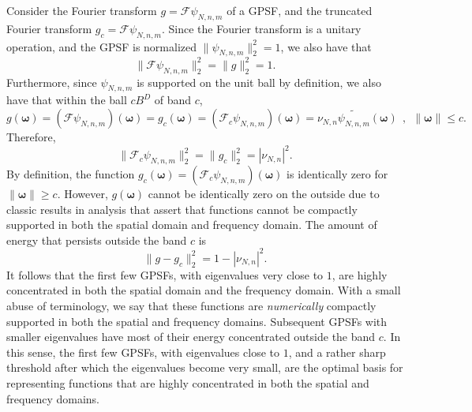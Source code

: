 \documentclass[12pt]{article}
\begin{document}
Consider the Fourier transform $g = \mathcal{F} \psi_{N,n,m}$ of a GPSF,
and the truncated Fourier transform $g_c = \mathcal{F} \psi_{N,n,m}$.
Since the Fourier transform is a unitary operation, and the GPSF is normalized $\|\psi_{N,n,m}\|_2^2=1$,
we also have that 
\begin{equation}
\| \mathcal{F} \psi_{N,n,m} \|_2^2 = \|g\|_2^2=1. 
\end{equation}
Furthermore, since $\psi_{N,n,m}$ is supported on the unit ball by definition, we also have that within the ball $cB^D$ of band $c$, 
\begin{equation}
g({\bm \omega}) = \left( \mathcal{F} \psi_{N,n,m}\right)({\bm \omega}) =  g_c({\bm \omega}) = \left( \mathcal{F}_c \psi_{N,n,m}\right)({\bm \omega}) = \nu_{N,n} \widetilde{\psi_{N,n,m}}({\bm \omega}) ~~,~~ \|{\bm \omega}\| \leq c.
\end{equation}
Therefore, 
\begin{equation}
\| \mathcal{F}_c \psi_{N,n,m} \|_2^2 = \|g_c\|_2^2= |\nu_{N,n}|^2. 
\end{equation}
By definition, the function $g_c({\bm \omega}) = \left(\mathcal{F}_c \psi_{N,n,m}\right)({\bm \omega})$ is identically zero for $\|{\bm \omega}\| \geq c$. 
However, $g({\bm \omega})$ cannot be identically zero on the outside due to classic results in analysis that assert that functions cannot be compactly supported in both the spatial domain and frequency domain. The amount of energy that persists outside the band $c$ is
\begin{equation}
 \| g-g_c \|_2^2 = 1-|\nu_{N,n}|^2.
\end{equation}
It follows that the first few GPSFs, with eigenvalues very close to $1$, are highly concentrated in both the spatial domain 
and the frequency domain. With a small abuse of terminology, we say that these functions are {\em numerically} compactly supported in both the spatial and frequency domains. Subsequent GPSFs with smaller eigenvalues have most of their energy concentrated outside the band $c$. In this sense, the first few GPSFs, with eigenvalues close to $1$, and a rather sharp threshold after which the eigenvalues become very small, are the optimal basis for representing functions that are highly concentrated in both the spatial and frequency domains. 




%
% 
%
%
%
\end{document}
